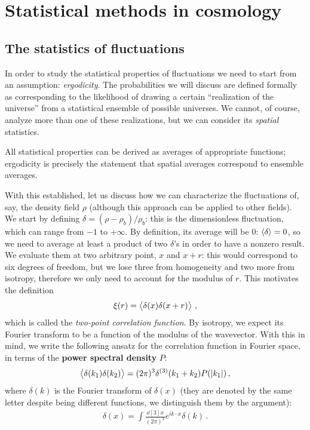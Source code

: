 \documentclass[main.tex]{subfiles}
\begin{document}
\section{Statistical methods in cosmology} \label{sec:statistical-methods}



\subsection{The statistics of fluctuations}

In order to study the statistical properties of fluctuations we need to start from an assumption: \emph{ergodicity}. 
The probabilities we will discuss are defined formally as corresponding to the likelihood of drawing a certain ``realization of the universe'' from a statistical ensemble of possible universes. 
We cannot, of course, analyze more than one of these realizations, but we can consider its \emph{spatial} statistics. 

All statistical properties can be derived as averages of appropriate functions; ergodicity is precisely the statement that spatial averages correspond to ensemble averages. 

With this established, let us discuss how we can characterize the fluctuations of, say, the density field \(\rho \) (although this approach can be applied to other fields). 
We start by defining \(\delta = (\rho - \rho_b) / \rho_b\):  this is the dimensionless fluctuation, which can range from \(-1\) to \(+ \infty \).
By definition, its average will be 0: \(\expval{ \delta } = 0\), so we need to average at least a product of two \(\delta \)'s in order to have a nonzero result. 
We evaluate them at two arbitrary point, \(x\) and \(x + r\): this would correspond to six degrees of freedom, but we lose three from homogeneity and two more from isotropy, therefore we only need to account for the modulus of \(r\). This motivates the definition 
%
\begin{align}
\xi (r) = \expval{ \delta (x) \delta (x+r)} 
\,,
\end{align}
%
which is called the \emph{two-point correlation function}.
By isotropy, we expect its Fourier transform to be a function of the modulus of the wavevector.
With this in mind, we write the following ansatz for the correlation function in Fourier space, in terms of the \textbf{power spectral density} \(P\): 
%
\begin{align}
\expval{ \delta (k_1 ) \delta (k_2)} = (2 \pi )^3 \delta^{(3)}(k_1 + k_2 ) P(\abs{k_1 })
\,,
\end{align}
%
where \(\delta (k)\) is the Fourier transform of \(\delta (x)\) (they are denoted by the same letter despite being different functions, we distinguish them by the argument): 
%
\begin{align}
\delta (x) = \int \frac{ \dd[3]{x}}{(2 \pi )^3} e^{i k \cdot x} \delta (k)
\,.
\end{align}
% 
\end{document}
